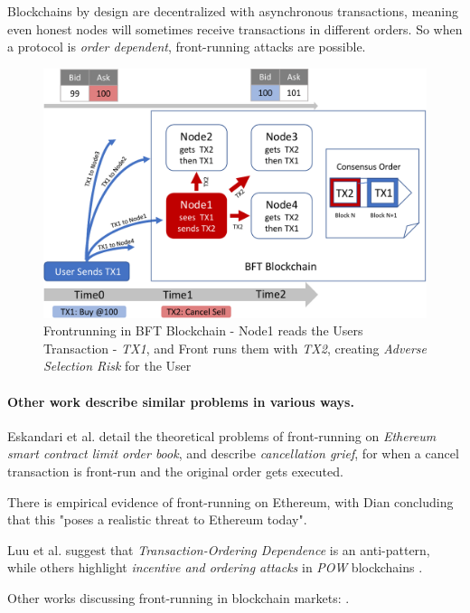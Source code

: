 \documentclass[12pt]{article}
\begin{document}
Blockchains by design are decentralized with asynchronous transactions, meaning even honest nodes will sometimes receive transactions in different orders. So when a protocol is \emph{order dependent}, front-running attacks are possible.

\begin{figure}[ht]
  \centering \includegraphics[scale=0.4]{frontrunning3-crop.pdf}
  \caption{Frontrunning in BFT Blockchain - Node1 reads the Users Transaction - \emph{TX1}, and Front runs them with \emph{TX2}, creating \emph{Adverse Selection Risk} for the User}\label{fig:front-running}
\end{figure}

\paragraph{Other work describe similar problems in various ways.} Eskandari et al. \cite{Eskandari} detail the theoretical problems of front-running on \emph{Ethereum} \emph{smart contract limit order book}, and describe \emph{cancellation grief}, for when a cancel transaction is front-run and the  original order gets executed. 

There is empirical evidence of front-running on Ethereum, with Dian concluding that this "poses a realistic threat to Ethereum today". \cite{Daian} 

Luu et al. \cite{Luu} suggest that \emph{Transaction-Ordering Dependence} is an anti-pattern, while others highlight \emph{incentive and ordering attacks} in \emph{POW} blockchains \cite{Judmayer} \cite{Delmolino}. 

Other works discussing front-running in blockchain markets: \cite{Malinova,Eskandari,Clark,Berg}.
\end{document}
